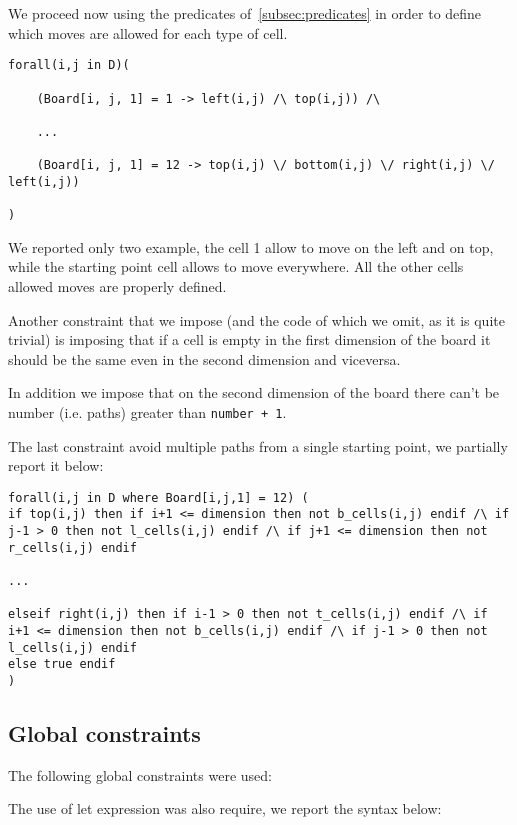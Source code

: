 We proceed now using the predicates of~\ref{subsec:predicates} in order to define which moves are allowed for each type of cell.


\begin{verbatim}
forall(i,j in D)(

    (Board[i, j, 1] = 1 -> left(i,j) /\ top(i,j)) /\

    ...

    (Board[i, j, 1] = 12 -> top(i,j) \/ bottom(i,j) \/ right(i,j) \/ left(i,j))

)
\end{verbatim}

We reported only two example, the cell 1 allow to move on the left and on top, while the starting point cell allows to move everywhere. All the other cells allowed moves are properly defined.

Another constraint that we impose (and the code of which we omit, as it is quite trivial) is imposing that if a cell is empty in the first dimension of the board it should be the same even in the second dimension and viceversa.

In addition we impose that on the second dimension of the board there can't be number (i.e. paths) greater than \texttt{number + 1}.

The last constraint avoid multiple paths from a single starting point, we partially report it below:

\begin{verbatim}
forall(i,j in D where Board[i,j,1] = 12) (
if top(i,j) then if i+1 <= dimension then not b_cells(i,j) endif /\ if j-1 > 0 then not l_cells(i,j) endif /\ if j+1 <= dimension then not r_cells(i,j) endif

...

elseif right(i,j) then if i-1 > 0 then not t_cells(i,j) endif /\ if i+1 <= dimension then not b_cells(i,j) endif /\ if j-1 > 0 then not l_cells(i,j) endif
else true endif
)
\end{verbatim}


\subsection{Global constraints}
The following global constraints were used:

The use of let expression was also require, we report the syntax below:

